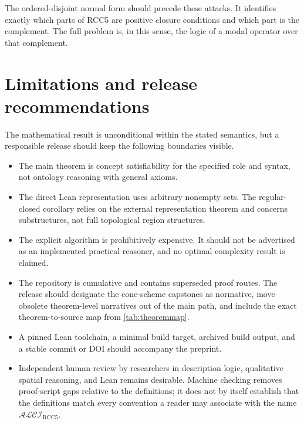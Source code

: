 \documentclass[11pt]{article}
\theoremstyle{plain}
\theoremstyle{definition}
\theoremstyle{remark}
\newcommand{\Logic}{\ensuremath{\mathcal{ALCI}_{\mathrm{RCC5}}}}
\begin{document}
The ordered-disjoint normal form should precede these attacks.  It identifies
exactly which parts of RCC5 are positive closure conditions and which part is
the complement.  The full problem is, in this sense, the logic of a modal
operator over that complement.

\section{Limitations and release recommendations}
\label{sec:limitations}

The mathematical result is unconditional within the stated semantics, but a
responsible release should keep the following boundaries visible.

\begin{itemize}
  \item The main theorem is concept satisfiability for the specified role and
  syntax, not ontology reasoning with general axioms.

  \item The direct Lean representation uses arbitrary nonempty sets.  The
  regular-closed corollary relies on the external representation theorem and
  concerns substructures, not full topological region structures.

  \item The explicit algorithm is prohibitively expensive.  It should not be
  advertised as an implemented practical reasoner, and no optimal complexity
  result is claimed.

  \item The repository is cumulative and contains superseded proof routes.
  The release should designate the cone-scheme capstones as normative, move
  obsolete theorem-level narratives out of the main path, and include the
  exact theorem-to-source map from \cref{tab:theoremmap}.

  \item A pinned Lean toolchain, a minimal build target, archived build output,
  and a stable commit or DOI should accompany the preprint.

  \item Independent human review by researchers in description logic,
  qualitative spatial reasoning, and Lean remains desirable.  Machine
  checking removes proof-script gaps relative to the definitions; it does not
  by itself establish that the definitions match every convention a reader
  may associate with the name $\Logic$.
\end{itemize}
\end{document}
